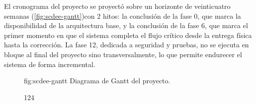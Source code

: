 El cronograma del proyecto se proyectó sobre un horizonte de
veinticuatro semanas (\cref{fig:scdee-gantt})con 2 hitos: la conclusión
de la fase 0, que marca la disponibilidad de la arquitectura
base, y la conclusión de la fase 6, que marca el primer momento en que el sistema completa el
flujo crítico desde la entrega física hasta la corrección. La fase 12,
dedicada a seguridad y pruebas, no se ejecuta en bloque al final del
proyecto sino transversalmente, lo que permite
endurecer el sistema de forma incremental.

\begin{figure}[Diagrama de Gantt del proyecto]%
              {fig:scdee-gantt}%
              {Diagrama de Gantt del proyecto.}
  \begin{gantt}{1}{24}
    \\
    \\
    \\
    \\
    \\
    \\
    \\
    \\
    \\
    \\
    \\
    \\
    \\
    \\
    \\
  \end{gantt}
\end{figure}

